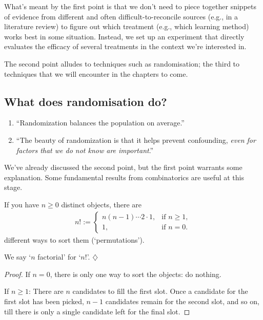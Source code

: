 \documentclass[a4paper]{tufte-book}\usepackage[]{graphicx}\usepackage[]{xcolor}
\newcommand*{\parend}[1][$\diamondsuit$]{%
\leavevmode\unskip\penalty9999 \hbox{}\nobreak\hfill
    \quad\hbox{#1}%
}
\begin{document}
What's meant by the first point is that we don't need to piece together snippets of evidence
from different and often difficult-to-reconcile sources (e.g., in a literature review) to figure
out which treatment (e.g., which learning method) works best in some situation.
Instead, we set up an experiment that directly evaluates the efficacy of several treatments
in the context we're interested in.

The second point alludes to techniques such as randomisation; the third to techniques
that we will encounter in the chapters to come.

\subsection{What does randomisation do?}
\begin{enumerate}
 \item ``Randomization balances the population on average.''
 \item ``The beauty of randomization is that it helps prevent confounding, \emph{even
for factors that we do not know are important}.'' \citep[p.~15, my emphasis]{Oehlert2010}
\end{enumerate}

We've already discussed the second point, 
but the first point warrants some explanation.
Some fundamental results from combinatorics are useful at this stage.

  If you have $n \geq 0$ distinct objects,
  there are 
  \begin{align*}
    n! := 
    \begin{cases}
      n(n-1)\cdots 2 \cdot 1, & \textrm{if $n \geq 1$}, \\
      1, &\textrm{if $n = 0$.}
    \end{cases}
  \end{align*}
  different ways to sort them (`permutations').
  
  We say `$n$ factorial' for `$n!$'.
\parend

\begin{proof}
  If $n = 0$, there is only one way to sort the objects: do nothing.

  If $n \geq 1$: There are $n$ candidates to fill the first slot.
  Once a candidate for the first slot has been picked,
  $n-1$ candidates remain for the second slot, and so on,
  till there is only a single candidate left for the final slot.
\end{proof}
\end{document}
